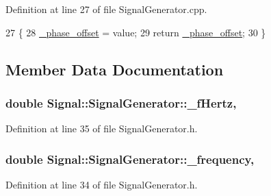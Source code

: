 Definition at line 27 of file Signal\+Generator.\+cpp.


\begin{DoxyCode}
27                                                                    \{
28     \hyperlink{classSignal_1_1SignalGenerator_a6b4444d46747c8517171edbbf4b5588f}{\_phase\_offset} = value;
29     \textcolor{keywordflow}{return} \hyperlink{classSignal_1_1SignalGenerator_a6b4444d46747c8517171edbbf4b5588f}{\_phase\_offset};
30 \}
\end{DoxyCode}


\subsection{Member Data Documentation}
\hypertarget{classSignal_1_1SignalGenerator_a85a4702347352bab1c71e0a8df8437d6}{
\subsubsection[{\+\_\+f\+Hertz}]{\setlength{\rightskip}{0pt plus 5cm}double Signal\+::\+Signal\+Generator\+::\+\_\+f\+Hertz\hspace{0.3cm}{\ttfamily [protected]}, {\ttfamily [inherited]}}}\label{classSignal_1_1SignalGenerator_a85a4702347352bab1c71e0a8df8437d6}


Definition at line 35 of file Signal\+Generator.\+h.

\hypertarget{classSignal_1_1SignalGenerator_a7f107461333bce68c5dad412db96a8c2}{
\subsubsection[{\+\_\+frequency}]{\setlength{\rightskip}{0pt plus 5cm}double Signal\+::\+Signal\+Generator\+::\+\_\+frequency\hspace{0.3cm}{\ttfamily [protected]}, {\ttfamily [inherited]}}}\label{classSignal_1_1SignalGenerator_a7f107461333bce68c5dad412db96a8c2}


Definition at line 34 of file Signal\+Generator.\+h.

